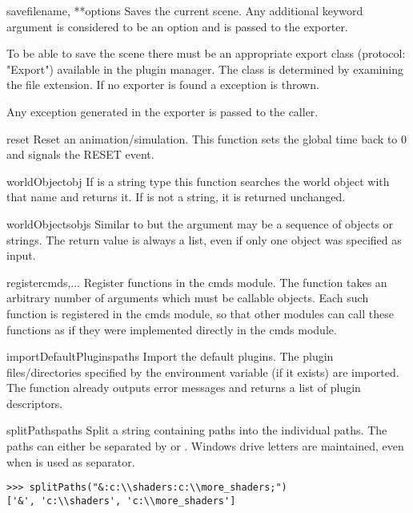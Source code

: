 \begin{funcdesc}{save}{filename, **options}
Saves the current scene. Any additional keyword argument
is considered to be an option and is passed to the exporter.

To be able to save the scene there must be an appropriate export class
(protocol: "Export") available in the plugin manager. The class is
determined by examining the file extension. If no exporter is found a
 exception is thrown. 

Any exception generated in the exporter is passed to the caller.
\end{funcdesc}

\begin{funcdesc}{reset}{}
Reset an animation/simulation. This function sets the global time
back to 0 and signals the RESET event.
\end{funcdesc}

\begin{funcdesc}{worldObject}{obj}
If  is a string type this function searches the world object with
that name and returns it. If  is not a string, it is returned
unchanged.
\end{funcdesc}

\begin{funcdesc}{worldObjects}{objs}
Similar to  but the argument may be a sequence of
objects or strings. The return value is always a list, even if only one
object was specified as input.
\end{funcdesc}

\begin{funcdesc}{register}{cmds,...}
Register functions in the cmds module. The function takes an arbitrary
number of arguments which must be callable objects. Each such function
is registered in the cmds module, so that other modules can call these
functions as if they were implemented directly in the cmds module.
\end{funcdesc}

\begin{funcdesc}{importDefaultPlugins}{paths}
Import the default plugins. The plugin files/directories specified by
the  environment variable (if it exists) are
imported.  The function already outputs error messages and returns a
list of plugin descriptors.
\end{funcdesc}

\begin{funcdesc}{splitPaths}{paths}
Split a string containing paths into the individual paths. The paths
can either be separated by \character{:} or \character{;}. Windows
drive letters are maintained, even when \character{:} is used as separator.

\begin{verbatim}
>>> splitPaths("&:c:\\shaders:c:\\more_shaders;")
['&', 'c:\\shaders', 'c:\\more_shaders']    
\end{verbatim}
\end{funcdesc}